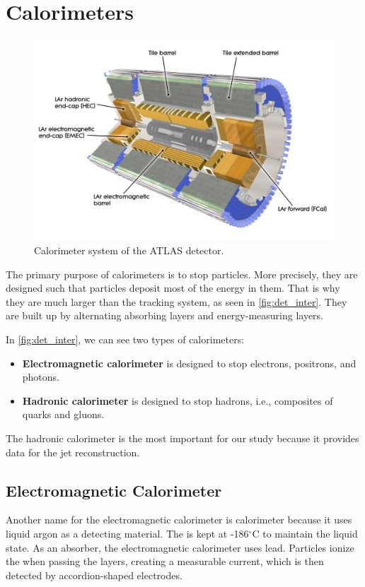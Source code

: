 \section{Calorimeters}
\label{sec:calorimeters}
\begin{figure}[htb]
    \centering
    \includegraphics[width=1\linewidth]{src/img/calo.jpg}
    \caption{Calorimeter system of the ATLAS detector.}
    \label{fig:calorimeter}
\end{figure}

The primary purpose of calorimeters is to stop particles. 
More precisely, they are designed such that particles deposit most of the energy in them.
That is why they are much larger than the tracking system, as seen in \cref{fig:det_inter}. 
They are built up by alternating absorbing layers and energy-measuring layers. 

In \cref{fig:det_inter}, we can see two types of calorimeters:
\begin{itemize}
    \item \textbf{Electromagnetic calorimeter} is designed to stop electrons, positrons, and photons.
    \item \textbf{Hadronic calorimeter} is designed to stop hadrons, i.e., composites of quarks and gluons.
\end{itemize}

The hadronic calorimeter is the most important for our study because it provides data for the jet reconstruction.


\subsection{Electromagnetic Calorimeter}
Another name for the electromagnetic calorimeter is \LAr calorimeter because it uses liquid argon as a detecting material.
The \LAr is kept at -186$^\circ$C to maintain the liquid state.
As an absorber, the electromagnetic calorimeter uses lead.
Particles ionize the \LAr when passing the layers, creating a measurable current, which is then detected by accordion-shaped electrodes.

